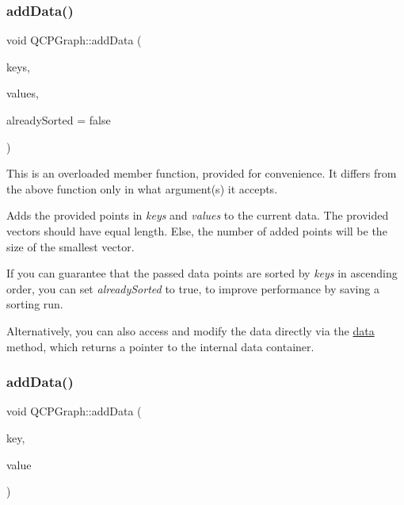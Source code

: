 \mbox{\label{class_q_c_p_graph_ae0555c0d3fe0fa7cb8628f88158d420f}} 
\subsubsection{\texorpdfstring{add\+Data()}{addData()}\hspace{0.1cm}{\footnotesize\ttfamily [1/2]}}
{\footnotesize\ttfamily void Q\+C\+P\+Graph\+::add\+Data (\begin{DoxyParamCaption}\item[{const Q\+Vector$<$ double $>$ \&}]{keys,  }\item[{const Q\+Vector$<$ double $>$ \&}]{values,  }\item[{bool}]{already\+Sorted = {\ttfamily false} }\end{DoxyParamCaption})}

This is an overloaded member function, provided for convenience. It differs from the above function only in what argument(s) it accepts.

Adds the provided points in {\itshape keys} and {\itshape values} to the current data. The provided vectors should have equal length. Else, the number of added points will be the size of the smallest vector.

If you can guarantee that the passed data points are sorted by {\itshape keys} in ascending order, you can set {\itshape already\+Sorted} to true, to improve performance by saving a sorting run.

Alternatively, you can also access and modify the data directly via the \hyperlink{class_q_c_p_graph_a141aa31a1f19bbd0ce60f55eaeb9ea60}{data} method, which returns a pointer to the internal data container. \mbox{\label{class_q_c_p_graph_a0bf98b1972286cfb7b1c4b7dd6ae2012}} 
\subsubsection{\texorpdfstring{add\+Data()}{addData()}\hspace{0.1cm}{\footnotesize\ttfamily [2/2]}}
{\footnotesize\ttfamily void Q\+C\+P\+Graph\+::add\+Data (\begin{DoxyParamCaption}\item[{double}]{key,  }\item[{double}]{value }\end{DoxyParamCaption})}

